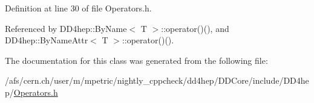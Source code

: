 Definition at line 30 of file Operators.\+h.



Referenced by D\+D4hep\+::\+By\+Name$<$ T $>$\+::operator()(), and D\+D4hep\+::\+By\+Name\+Attr$<$ T $>$\+::operator()().



The documentation for this class was generated from the following file\+:\begin{DoxyCompactItemize}
\item 
/afs/cern.\+ch/user/m/mpetric/nightly\+\_\+cppcheck/dd4hep/\+D\+D\+Core/include/\+D\+D4hep/\hyperlink{_operators_8h}{Operators.\+h}\end{DoxyCompactItemize}
